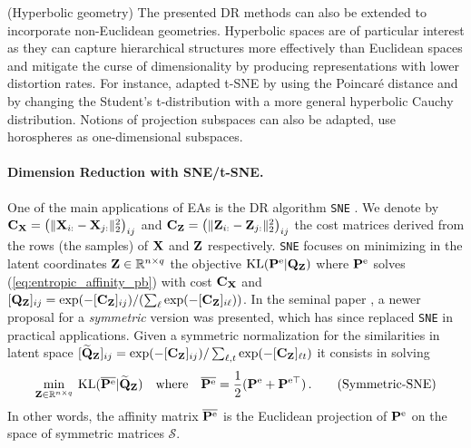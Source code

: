 \begin{remark}{(Hyperbolic geometry)} 
The presented DR methods can also be extended to incorporate non-Euclidean geometries. Hyperbolic spaces \citep{Chami21, Fan_2022_CVPR, Guo22, Lin23} are of particular interest as they can capture hierarchical structures more effectively than Euclidean spaces and mitigate the curse of dimensionality by producing representations with lower distortion rates. 
For instance, \citet{Guo22} adapted t-SNE by using the Poincaré distance and by changing the Student's t-distribution with a more general hyperbolic Cauchy distribution.  Notions of projection subspaces can also be adapted, \eg \citet{Chami21} use horospheres as one-dimensional subspaces. 
\end{remark}


\paragraph{Dimension Reduction with SNE/t-SNE.} One of the main applications of EAs
is the DR algorithm \texttt{SNE} \citep{hinton2002stochastic}. We
denote by $\mathbf{C}_{\mathbf{X}} = \left(\|\mathbf{X}_{i:}-\mathbf{X}_{j:}\|_2^2\right)_{ij}$ and $\mathbf{C}_{\mathbf{Z}} =
\left(\|\mathbf{Z}_{i:}-\mathbf{Z}_{j:}\|_2^2\right)_{ij}$ the cost matrices derived from the
rows (\ie the samples) of $\mathbf{X}$ and $\mathbf{Z}$ respectively. \texttt{SNE} focuses on
minimizing in the latent coordinates $\mathbf{Z} \in \mathbb{R}^{n \times q}$ the objective
$\operatorname{KL}(\mathbf{P}^\mathrm{e} | \mathbf{Q}_{\mathbf{Z}})$ where $\mathbf{P}^\mathrm{e}$ solves
(\ref{eq:entropic_affinity_pb}) with cost $\mathbf{C}_{\mathbf{X}}$ and $[\mathbf{Q}_{\mathbf{Z}}]_{ij} = \exp(-[\mathbf{C}_{\mathbf{Z}}]_{ij})/(\sum_{\ell}\exp(-[\mathbf{C}_{\mathbf{Z}}]_{i\ell}))$. In the seminal paper \citep{van2008visualizing}, a newer proposal for a \emph{symmetric} version was presented, which has since replaced \texttt{SNE} in practical applications. Given a symmetric
normalization for the similarities in latent space $[\widetilde{\mathbf{Q}}_{\mathbf{Z}}]_{ij} = \exp(-[\mathbf{C}_{\mathbf{Z}}]_{ij})/\sum_{\ell,t}\exp(-[\mathbf{C}_{\mathbf{Z}}]_{\ell t})$ it consists in solving 
\begin{align}\label{symmetrization_tsne}
    \min_{\mathbf{Z} \in \mathbb{R}^{n \times q}} \: \operatorname{KL}(\overline{\mathbf{P}^{\mathrm{e}}} | \widetilde{\mathbf{Q}}_{\mathbf{Z}}) \quad \text{where} \quad \overline{\mathbf{P}^{\mathrm{e}}} = \frac{1}{2}(\mathbf{P}^{\mathrm{e}} + \mathbf{P}^{\mathrm{e} \top}) \,.
\tag{Symmetric-SNE}
\end{align}
In other words, the affinity matrix $\overline{\mathbf{P}^{\mathrm{e}}}$ is the Euclidean projection of $\mathbf{P}^{\mathrm{e}}$ on the space of symmetric matrices $\mathcal{S}$.


